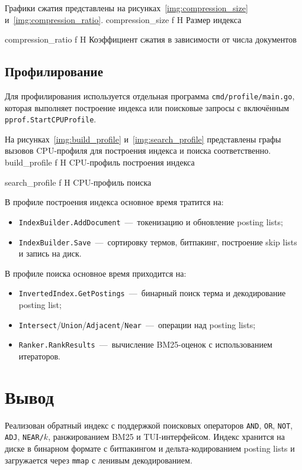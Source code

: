 \documentclass{itmo}
\begin{document}
Графики сжатия представлены на рисунках~\ref{img:compression_size} и~\ref{img:compression_ratio}.
	{compression_size}
	{f}
	{H}
	{\textwidth}
	{Размер индекса}

	{compression_ratio}
	{f}
	{H}
	{\textwidth}
	{Коэффициент сжатия в зависимости от числа документов}

\section{Профилирование}

Для профилирования используется отдельная программа \texttt{cmd/profile/main.go}, которая выполняет построение индекса или поисковые запросы с включённым \texttt{pprof.StartCPUProfile}.

На рисунках~\ref{img:build_profile} и~\ref{img:search_profile} представлены графы вызовов CPU-профиля для построения индекса и поиска соответственно.
	{build_profile}
	{f}
	{H}
	{\textwidth}
	{CPU-профиль построения индекса}

	{search_profile}
	{f}
	{H}
	{\textwidth}
	{CPU-профиль поиска}

В профиле построения индекса основное время тратится на:
\begin{itemize}
	\item \texttt{IndexBuilder.AddDocument}~---~токенизацию и обновление posting lists;
	\item \texttt{IndexBuilder.Save}~---~сортировку термов, битпакинг, построение skip lists и запись на диск.
\end{itemize}

В профиле поиска основное время приходится на:
\begin{itemize}
	\item \texttt{InvertedIndex.GetPostings}~---~бинарный поиск терма и декодирование posting list;
	\item \texttt{Intersect}/\texttt{Union}/\texttt{Adjacent}/\texttt{Near}~---~операции над posting lists;
	\item \texttt{Ranker.RankResults}~---~вычисление BM25-оценок с использованием итераторов.
\end{itemize}

\chapter{Вывод}

Реализован обратный индекс с поддержкой поисковых операторов \texttt{AND}, \texttt{OR}, \texttt{NOT}, \texttt{ADJ}, \texttt{NEAR/$k$}, ранжированием BM25 и TUI-интерфейсом.
Индекс хранится на диске в бинарном формате с битпакингом и дельта-кодированием posting lists и загружается через \texttt{mmap} с ленивым декодированием.
\end{document}
